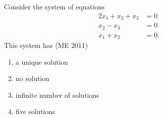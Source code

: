 \item Consider the system of equations
	\begin{align*}
 2x_1 + x_2 + x_3 &= 0 \\  
 x_2 - x_3 &= 0 \\  
 x_1 + x_2 &= 0.  
	\end{align*}
This system has
\hfill (ME 2011)
\begin{multicols}{2}
\begin{enumerate}
\item a unique solution  
\item no solution  
\item infinite number of solutions  
\item five solutions  
\end{enumerate}
\end{multicols}   

